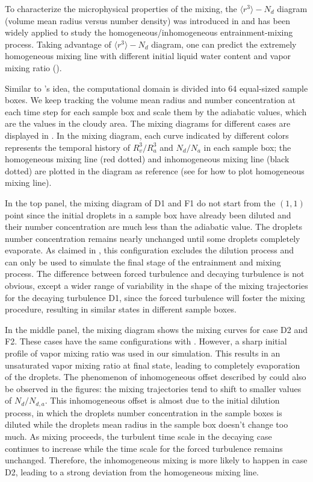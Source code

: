 To characterize the microphysical properties of the mixing, the $\langle
r^3\rangle -N_d$ diagram (volume mean radius versus number density) was
introduced in \cite{Burnet07} and has been widely applied to study the
homogeneous/inhomogeneous entrainment-mixing process. Taking advantage of
$\langle r^3\rangle -N_d$ diagram, one can predict the extremely homogeneous
mixing line with different initial liquid water content and vapor mixing ratio
(\cite{Lehmann09,Kumar14}).

Similar to \cite{Kumar14}'s idea, the computational domain is divided into $64$
equal-sized sample boxes. We keep tracking the volume mean radius and number
concentration at each time step for each sample box and scale them by the
adiabatic values, which are the values in the cloudy area. The mixing diagrams
for different cases are displayed in . In the mixing
diagram, each curve indicated by different colors represents the temporal
history of $R_v^3/R_a^3$ and $N_d/N_a$ in each sample box; the homogeneous
mixing line (red dotted) and inhomogeneous mixing line (black dotted) are
plotted in the diagram as reference (see \cite{Burnet07} for how to plot
homogeneous mixing line).

In the top panel, the mixing diagram of D1 and F1 do not start from the $(1,1)$
point since the initial droplets in a sample box have already been diluted and
their number concentration are much less than the adiabatic value. The droplets
number concentration remains nearly unchanged until some droplets completely
evaporate. As claimed in \cite{And04}, this configuration excludes the dilution
process and can only be used to simulate the final stage of the entrainment and
mixing process. The difference between forced turbulence and decaying
turbulence is not obvious, except a wider range of variability in the shape of
the mixing trajectories for the decaying turbulence D1, since the forced
turbulence will foster the mixing procedure, resulting in similar states in
different sample boxes.

In the middle panel, the mixing diagram shows the mixing curves for case D2 and
F2. These cases have the same configurations with \cite{Kumar14}. However, a
sharp initial profile of vapor mixing ratio was used in our simulation. This
results in an unsaturated vapor mixing ratio at final state, leading to
completely evaporation of the droplets. The phenomenon of inhomogeneous offset
described by \cite{Kumar14} could also be observed in the figures: the mixing
trajectories tend to shift to smaller values of $N_d/N_{d,a}$. This
inhomogeneous offset is almost due to the initial dilution process, in which
the droplets number concentration in the sample boxes is diluted while the
droplets mean radius in the sample box doesn't change too much. As mixing
proceeds, the turbulent time scale in the decaying case continues to increase
while the time scale for the forced turbulence remains unchanged. Therefore,
the inhomogeneous mixing is more likely to happen in case D2, leading to a
strong deviation from the homogeneous mixing line.

